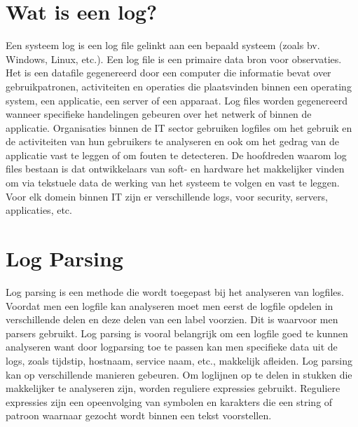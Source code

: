 \section{Wat is een log?}

Een systeem log is een log file gelinkt aan een bepaald systeem (zoals bv. Windows, Linux, etc.). Een log file is een primaire data bron voor observaties. Het is een datafile gegenereerd door een computer die informatie bevat over gebruikpatronen, activiteiten en operaties die plaatsvinden binnen een operating system, een applicatie, een server of een apparaat. Log files worden gegenereerd wanneer specifieke handelingen gebeuren over het netwerk of binnen de applicatie. Organisaties binnen de IT sector gebruiken logfiles om het gebruik en de activiteiten van hun gebruikers te analyseren en ook om het gedrag van de applicatie vast te leggen of om fouten te detecteren. De hoofdreden waarom log files bestaan is dat ontwikkelaars van soft- en hardware het makkelijker vinden om via tekstuele data de werking van het systeem te volgen en vast te leggen. Voor elk domein binnen IT zijn er verschillende logs, voor security, servers, applicaties, etc.

\section{Log Parsing}

Log parsing is een methode die wordt toegepast bij het analyseren van logfiles. Voordat men een logfile kan analyseren moet men eerst de logfile opdelen in verschillende delen en deze delen van een label voorzien. Dit is waarvoor men parsers gebruikt. Log parsing is vooral belangrijk om een logfile goed te kunnen analyseren want door logparsing toe te passen kan men specifieke data uit de logs, zoals tijdstip, hostnaam, service naam, etc., makkelijk afleiden. Log parsing kan op verschillende manieren gebeuren. Om loglijnen op te delen in stukken die makkelijker te analyseren zijn, worden reguliere expressies gebruikt. Reguliere expressies zijn een opeenvolging van symbolen en karakters die een string of patroon waarnaar gezocht wordt binnen een tekst voorstellen.

